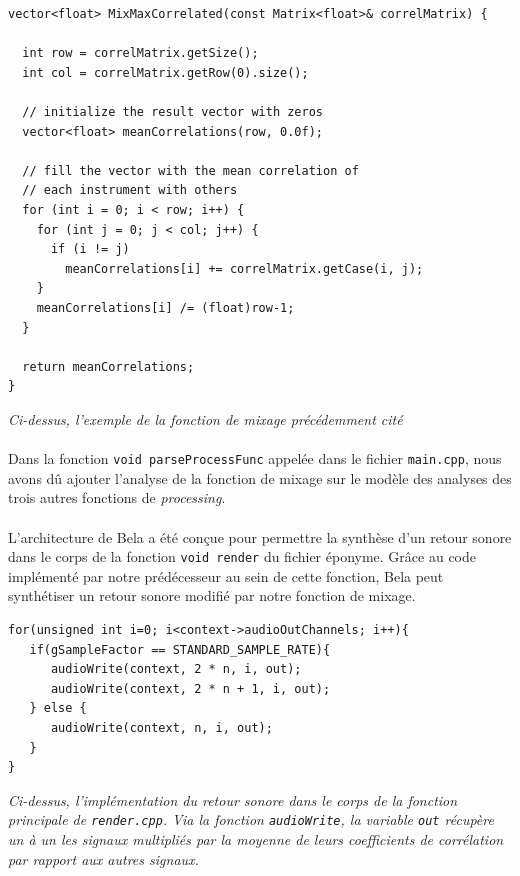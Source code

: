 \begin{lstlisting}
vector<float> MixMaxCorrelated(const Matrix<float>& correlMatrix) {

  int row = correlMatrix.getSize();
  int col = correlMatrix.getRow(0).size();

  // initialize the result vector with zeros
  vector<float> meanCorrelations(row, 0.0f);

  // fill the vector with the mean correlation of
  // each instrument with others
  for (int i = 0; i < row; i++) {
    for (int j = 0; j < col; j++) {
      if (i != j)
        meanCorrelations[i] += correlMatrix.getCase(i, j);
    }
    meanCorrelations[i] /= (float)row-1;
  }

  return meanCorrelations;
}
\end{lstlisting}

\begin{center}
 \textit{Ci-dessus, l'exemple de la fonction de mixage précédemment cité}
\end{center}

\paragraph{}
Dans la fonction \verb!void parseProcessFunc!  appelée dans le fichier
\verb!main.cpp!, nous avons dû ajouter l'analyse de la fonction de
mixage sur le modèle des analyses des trois autres fonctions de
\textit{processing}.

\paragraph{}
L'architecture de Bela a été conçue pour permettre la synthèse d'un
retour sonore dans le corps de la fonction \verb!void render! du
fichier éponyme. Grâce au code implémenté par notre prédécesseur au
sein de cette fonction, Bela peut synthétiser un retour sonore modifié
par notre fonction de mixage.

\begin{lstlisting}
for(unsigned int i=0; i<context->audioOutChannels; i++){
   if(gSampleFactor == STANDARD_SAMPLE_RATE){
      audioWrite(context, 2 * n, i, out);
      audioWrite(context, 2 * n + 1, i, out);
   } else {
      audioWrite(context, n, i, out);
   }
}
\end{lstlisting}

\begin{center} \textit{Ci-dessus, l'implémentation du retour sonore
dans le corps de la fonction principale de \verb!render.cpp!. Via la
fonction \verb!audioWrite!, la variable \verb!out! récupère un à un
les signaux multipliés par la moyenne de leurs coefficients de
corrélation par rapport aux autres signaux.} \end{center}


